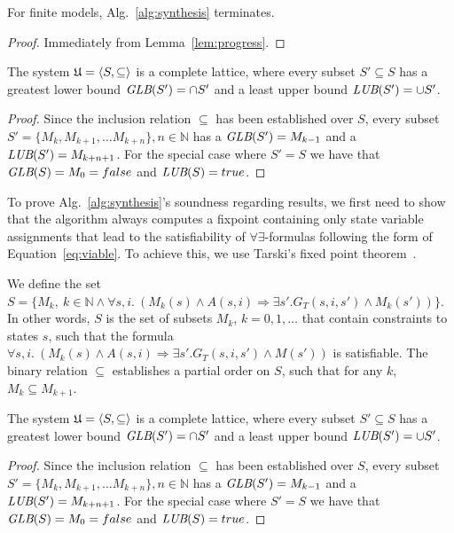 \begin{theorem}
For finite models, Alg.~\ref{alg:synthesis} terminates.
\end{theorem}
\begin{proof}
Immediately from Lemma~\ref{lem:progress}.
\end{proof}




\iffalse
The system $\mathfrak{U} = \langle S, \subseteq \rangle$ is a complete lattice, where every subset $S' \subseteq S$ has a greatest lower bound  $\textit {GLB}(S') = \cap S'$  and a least upper bound $\textit {LUB}(S') = \cup S'$.
\label{lem:altlattice}

\begin{proof}
Since the inclusion relation $\subseteq$ has been established over $S$, every subset $S' = \{M_k, M_{k+1}, \ldots M_{k+n}\}, n \in \mathbb{N}$ has a $\textit {GLB}(S') = M_{k-1}$ and a $\textit {LUB}(S') = M_{k+n+1}$. For the special case where $S' = S$ we have that $\textit {GLB}(S) = M_0 = false$ and $\textit {LUB}(S) = true$.
\end{proof}

\label{sec:soundness}
To prove Alg.~\ref{alg:synthesis}'s soundness regarding results, we first need to show that the algorithm always computes a fixpoint containing only state variable assignments that lead to the satisfiability of $\forall\exists$-formulas following the form of Equation~\ref{eq:viable}. To achieve this, we
use Tarski's fixed point theorem~\cite{tarski1955lattice}.



We define the set $S = \{M_k, \ k \in \mathbb{N} \land \forall s, i. \ (M_k(s) \land A(s,i) \Rightarrow \exists s'. G_T(s,i,s') \land M_k(s'))\}$. In other words, $S$ is the set of subsets $M_k$, $k = 0, 1 , \ldots$ that contain constraints to states $s$, such that the formula $\forall s, i. \ (M_k(s) \land A(s,i) \Rightarrow \exists s'. G_T(s,i,s') \land M(s'))$ is satisfiable. The binary relation $\subseteq$ establishes a partial order on $S$, such that for any $k$, $M_k \subseteq M_{k+1}$.

\begin{lemma} The system $\mathfrak{U} = \langle S, \subseteq \rangle$ is a complete lattice, where every subset $S' \subseteq S$ has a greatest lower bound  $\textit {GLB}(S') = \cap S'$  and a least upper bound $\textit {LUB}(S') = \cup S'$.
\label{lem:altlattice}
\end{lemma}
\begin{proof}
Since the inclusion relation $\subseteq$ has been established over $S$, every subset $S' = \{M_k, M_{k+1}, \ldots M_{k+n}\}, n \in \mathbb{N}$ has a $\textit {GLB}(S') = M_{k-1}$ and a $\textit {LUB}(S') = M_{k+n+1}$. For the special case where $S' = S$ we have that $\textit {GLB}(S) = M_0 = false$ and $\textit {LUB}(S) = true$.
\end{proof}

